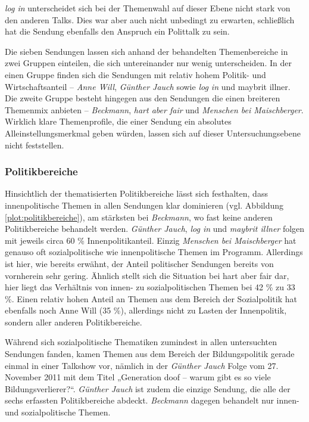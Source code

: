 \textit{log in} unterscheidet sich bei der Themenwahl auf dieser Ebene nicht stark von den anderen Talks. Dies war aber auch nicht unbedingt zu erwarten, schließlich hat die Sendung ebenfalls den Anspruch ein Polittalk zu sein.

Die sieben Sendungen lassen sich anhand der behandelten Themenbereiche in zwei Gruppen einteilen, die sich untereinander nur wenig unterscheiden. In der einen Gruppe finden sich die Sendungen mit relativ hohem Politik- und Wirtschaftsanteil – \textit{Anne Will}, \textit{Günther Jauch} sowie \textit{log in} und maybrit illner. Die zweite Gruppe besteht hingegen aus den Sendungen die einen breiteren Themenmix anbieten – \textit{Beckmann}, \textit{hart aber fair} und \textit{Menschen bei Maischberger}. Wirklich klare Themenprofile, die einer Sendung ein absolutes Alleinstellungsmerkmal geben würden, lassen sich auf dieser Untersuchungsebene nicht feststellen.

\subsubsection{Politikbereiche}

Hinsichtlich der thematisierten Politikbereiche lässt sich festhalten, dass innenpolitische Themen in allen Sendungen klar dominieren (vgl. Abbildung \vref{plot:politikbereiche}), am stärksten bei \textit{Beckmann}, wo fast keine anderen Politikbereiche behandelt werden. \textit{Günther Jauch}, \textit{log in} und \textit{maybrit illner} folgen mit jeweils circa 60 \% Innenpolitikanteil. Einzig \textit{Menschen bei Maischberger} hat genauso oft sozialpolitische wie innenpolitische Themen im Programm. Allerdings ist hier, wie bereits erwähnt, der Anteil politischer Sendungen bereits von vornherein sehr gering. Ähnlich stellt sich die Situation bei hart aber fair dar, hier liegt das Verhältnis von innen- zu sozialpolitischen Themen bei 42 \% zu 33 \%. Einen relativ hohen Anteil an Themen aus dem Bereich der Sozialpolitik hat ebenfalls noch Anne Will (35 \%), allerdings nicht zu Lasten der Innenpolitik, sondern aller anderen Politikbereiche.

Während sich sozialpolitische Thematiken zumindest in allen untersuchten Sendungen fanden, kamen Themen aus dem Bereich der Bildungspolitik gerade einmal in einer Talkshow vor, nämlich in der \textit{Günther Jauch} Folge vom 27. November 2011 mit dem Titel „Generation doof – warum gibt es so viele Bildungsverlierer?“. \textit{Günther Jauch} ist zudem die einzige Sendung, die alle der sechs erfassten Politikbereiche abdeckt. \textit{Beckmann} dagegen behandelt nur innen- und sozialpolitische Themen.

